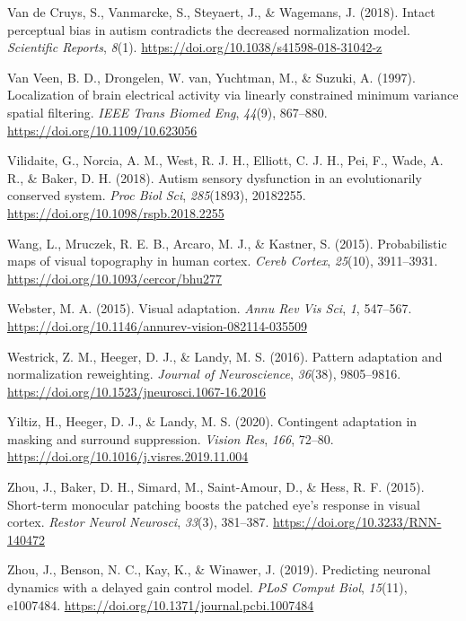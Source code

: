 \documentclass[
]{article}
\newlength{\cslhangindent}
\newlength{\cslentryspacingunit} %
\newenvironment{CSLReferences}[2] %
 {%
  \setlength{\parindent}{0pt}
  \ifodd #1
  \let\oldpar\par
  \def\par{\hangindent=\cslhangindent\oldpar}
  \fi
  \setlength{\parskip}{#2\cslentryspacingunit}
 }%
 {}
\begin{document}
\begin{CSLReferences}{1}{0}
\leavevmode{}%
Van de Cruys, S., Vanmarcke, S., Steyaert, J., \& Wagemans, J. (2018). Intact perceptual bias in autism contradicts the decreased normalization model. \emph{Scientific Reports}, \emph{8}(1). \url{https://doi.org/10.1038/s41598-018-31042-z}

\leavevmode{}%
Van Veen, B. D., Drongelen, W. van, Yuchtman, M., \& Suzuki, A. (1997). Localization of brain electrical activity via linearly constrained minimum variance spatial filtering. \emph{IEEE Trans Biomed Eng}, \emph{44}(9), 867--880. \url{https://doi.org/10.1109/10.623056}

\leavevmode{}%
Vilidaite, G., Norcia, A. M., West, R. J. H., Elliott, C. J. H., Pei, F., Wade, A. R., \& Baker, D. H. (2018). Autism sensory dysfunction in an evolutionarily conserved system. \emph{Proc Biol Sci}, \emph{285}(1893), 20182255. \url{https://doi.org/10.1098/rspb.2018.2255}

\leavevmode{}%
Wang, L., Mruczek, R. E. B., Arcaro, M. J., \& Kastner, S. (2015). Probabilistic maps of visual topography in human cortex. \emph{Cereb Cortex}, \emph{25}(10), 3911--3931. \url{https://doi.org/10.1093/cercor/bhu277}

\leavevmode{}%
Webster, M. A. (2015). Visual adaptation. \emph{Annu Rev Vis Sci}, \emph{1}, 547--567. \url{https://doi.org/10.1146/annurev-vision-082114-035509}

\leavevmode{}%
Westrick, Z. M., Heeger, D. J., \& Landy, M. S. (2016). Pattern adaptation and normalization reweighting. \emph{Journal of Neuroscience}, \emph{36}(38), 9805--9816. \url{https://doi.org/10.1523/jneurosci.1067-16.2016}

\leavevmode{}%
Yiltiz, H., Heeger, D. J., \& Landy, M. S. (2020). Contingent adaptation in masking and surround suppression. \emph{Vision Res}, \emph{166}, 72--80. \url{https://doi.org/10.1016/j.visres.2019.11.004}

\leavevmode{}%
Zhou, J., Baker, D. H., Simard, M., Saint-Amour, D., \& Hess, R. F. (2015). Short-term monocular patching boosts the patched eye's response in visual cortex. \emph{Restor Neurol Neurosci}, \emph{33}(3), 381--387. \url{https://doi.org/10.3233/RNN-140472}

\leavevmode{}%
Zhou, J., Benson, N. C., Kay, K., \& Winawer, J. (2019). Predicting neuronal dynamics with a delayed gain control model. \emph{PLoS Comput Biol}, \emph{15}(11), e1007484. \url{https://doi.org/10.1371/journal.pcbi.1007484}

\end{CSLReferences}
\end{document}
